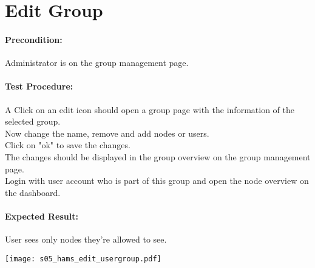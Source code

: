 \documentclass{scrreprt}
\begin{document}
\begin{minipage}[c]{0.4\textwidth}
\section{Edit Group}

\paragraph{Precondition:}
Administrator is on the group management page.\\

\paragraph{Test Procedure:}
A Click on an edit icon  should open a group page with the information of the selected group.\\
Now change the name, remove and add nodes or users.\\ 
Click on "ok" to save the changes.\\
The changes should be displayed in the group overview on the group management page.\\
Login with user account who is part of this group and open the node
overview on the dashboard.\\

\paragraph{Expected Result:}
User sees only nodes they're allowed to see.

\end{minipage}
\hfill
\begin{minipage}[c]{0.5\textwidth}
	\texttt{[image: s05\_hams\_edit\_usergroup.pdf]}
\end{minipage}
\end{document}
